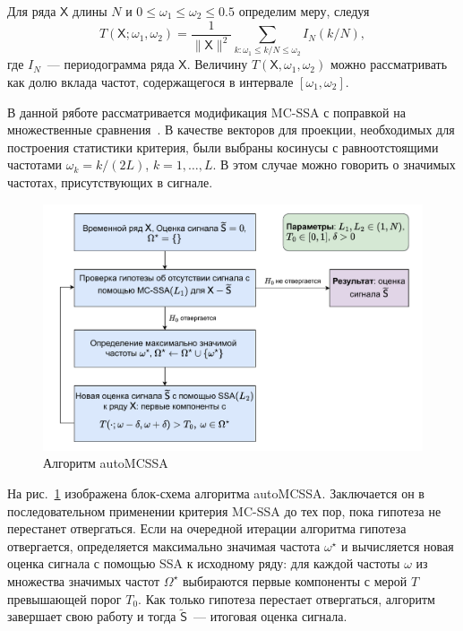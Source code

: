 \documentclass[12pt]{article}
\begin{document}
Для ряда $\mathsf{X}$ длины $N$ и $0\leqslant\omega_1\leqslant\omega_2\leqslant0.5$ определим меру, следуя~\cite{alexandrov}
$$
T(\mathsf{X};\omega_1,\omega_2)=\frac{1}{\|\mathsf{X}\|^2}\sum_{k:\omega_1\leqslant k/N\leqslant \omega_2}I_N(k/N),
$$
где $I_N$~--- периодограмма ряда $\mathsf{X}$. Величину $T(\mathsf{X},\omega_1,\omega_2)$ можно рассматривать как долю вклада частот, содержащегося в интервале $[\omega_1,\omega_2]$.

В данной ряботе рассматривается модификация MC-SSA с поправкой на множественные сравнения~\cite{Golyandina2023}. В качестве векторов для проекции, необходимых для построения статистики критерия, были выбраны косинусы с равноотстоящими частотами $\omega_k=k/(2L)$, $k=1,\ldots,L$. В этом случае можно говорить о значимых частотах, присутствующих в сигнале.

\begin{figure}[htbp]
    \centering
    \includegraphics[width=\textwidth]{img/auto_mcssa_alg.pdf}
    \caption{Алгоритм autoMCSSA}
    \label{fig:autoMCSSA_alg}
\end{figure}

На рис.~\ref{fig:autoMCSSA_alg} изображена блок-схема алгоритма autoMCSSA. Заключается он в последовательном применении критерия MC-SSA до тех пор, пока гипотеза не перестанет отвергаться. Если на очередной итерации алгоритма гипотеза отвергается, определяется максимально значимая частота $\omega^\star$ и вычисляется новая оценка сигнала с помощью SSA к исходному ряду: для каждой частоты $\omega$ из множества значимых частот $\Omega^\star$ выбираются первые компоненты с мерой $T$ превышающей порог $T_0$. Как только гипотеза перестает отвергаться, алгоритм завершает свою работу и тогда $\widetilde{\mathsf{S}}$~--- итоговая оценка сигнала.
\end{document}
